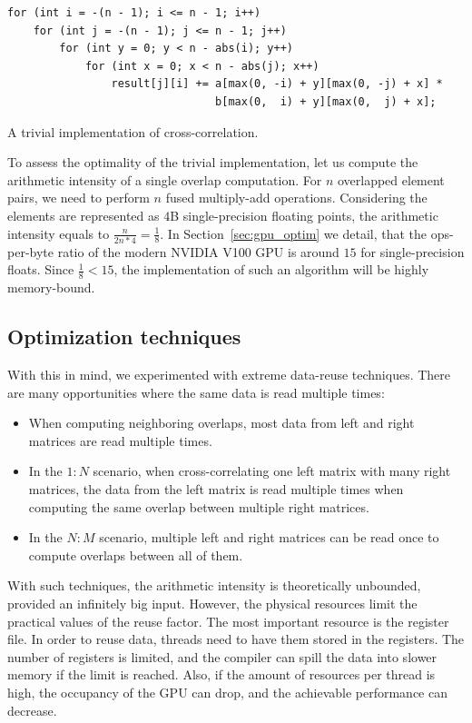 \begin{listing}
\begin{verbatim}
for (int i = -(n - 1); i <= n - 1; i++)
    for (int j = -(n - 1); j <= n - 1; j++)
        for (int y = 0; y < n - abs(i); y++)
            for (int x = 0; x < n - abs(j); x++)
                result[j][i] += a[max(0, -i) + y][max(0, -j) + x] * 
                                b[max(0,  i) + y][max(0,  j) + x];
\end{verbatim}
\caption{A trivial implementation of cross-correlation.}
\label{lst:cross}
\end{listing}

To assess the optimality of the trivial implementation, let us compute the arithmetic intensity of a single overlap computation. For $n$ overlapped element pairs, we need to perform $n$ fused multiply-add operations. Considering the elements are represented as $4$B single-precision floating points, the arithmetic intensity equals to $\frac{n}{2n * 4} = \frac{1}{8}$. In Section~\ref{sec:gpu_optim} we detail, that the ops-per-byte ratio of the modern NVIDIA V100 GPU is around $15$ for single-precision floats. Since $\frac{1}{8} < 15$, the implementation of such an algorithm will be highly memory-bound.

\subsection{Optimization techniques}

With this in mind, we experimented with extreme data-reuse techniques. There are many opportunities where the same data is read multiple times:
\begin{itemize}
    \item When computing neighboring overlaps, most data from left and right matrices are read multiple times.
    \item In the $1:N$ scenario, when cross-correlating one left matrix with many right matrices, the data from the left matrix is read multiple times when computing the same overlap between multiple right matrices.
    \item In the $N:M$ scenario, multiple left and right matrices can be read once to compute overlaps between all of them.
\end{itemize}

With such techniques, the arithmetic intensity is theoretically unbounded, provided an infinitely big input. However, the physical resources limit the practical values of the reuse factor. The most important resource is the register file. In order to reuse data, threads need to have them stored in the registers. The number of registers is limited, and the compiler can spill the data into slower memory if the limit is reached. Also, if the amount of resources per thread is high, the occupancy of the GPU can drop, and the achievable performance can decrease. 

